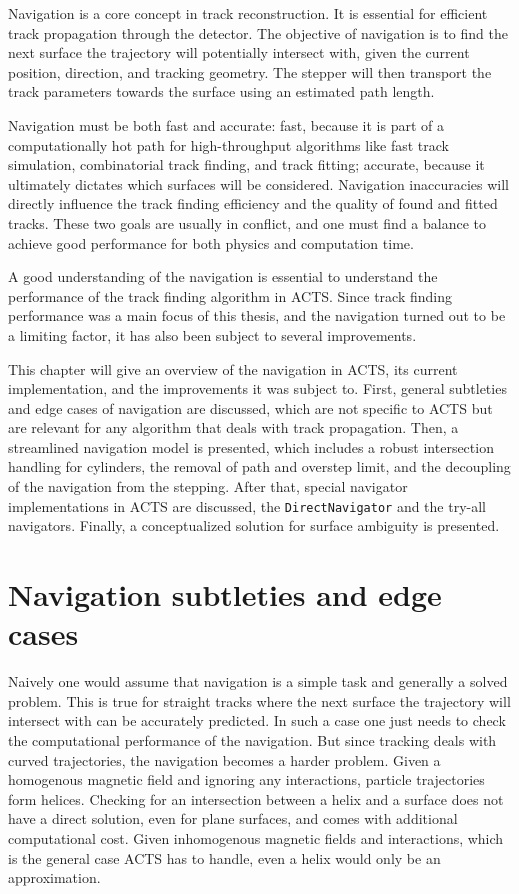 Navigation is a core concept in track reconstruction. It is essential for efficient track propagation through the detector. The objective of navigation is to find the next surface the trajectory will potentially intersect with, given the current position, direction, and tracking geometry. The stepper will then transport the track parameters towards the surface using an estimated path length.

Navigation must be both fast and accurate: fast, because it is part of a computationally hot path for high-throughput algorithms like fast track simulation, combinatorial track finding, and track fitting; accurate, because it ultimately dictates which surfaces will be considered. Navigation inaccuracies will directly influence the track finding efficiency and the quality of found and fitted tracks. These two goals are usually in conflict, and one must find a balance to achieve good performance for both physics and computation time.

A good understanding of the navigation is essential to understand the performance of the track finding algorithm in ACTS. Since track finding performance was a main focus of this thesis, and the navigation turned out to be a limiting factor, it has also been subject to several improvements.

This chapter will give an overview of the navigation in ACTS, its current implementation, and the improvements it was subject to. First, general subtleties and edge cases of navigation are discussed, which are not specific to ACTS but are relevant for any algorithm that deals with track propagation. Then, a streamlined navigation model is presented, which includes a robust intersection handling for cylinders, the removal of path and overstep limit, and the decoupling of the navigation from the stepping. After that, special navigator implementations in ACTS are discussed, the \texttt{DirectNavigator} and the try-all navigators. Finally, a conceptualized solution for surface ambiguity is presented.

\section{Navigation subtleties and edge cases}

Naively one would assume that navigation is a simple task and generally a solved problem. This is true for straight tracks where the next surface the trajectory will intersect with can be accurately predicted. In such a case one just needs to check the computational performance of the navigation. But since tracking deals with curved trajectories, the navigation becomes a harder problem. Given a homogenous magnetic field and ignoring any interactions, particle trajectories form helices. Checking for an intersection between a helix and a surface does not have a direct solution, even for plane surfaces, and comes with additional computational cost. Given inhomogenous magnetic fields and interactions, which is the general case ACTS has to handle, even a helix would only be an approximation.

